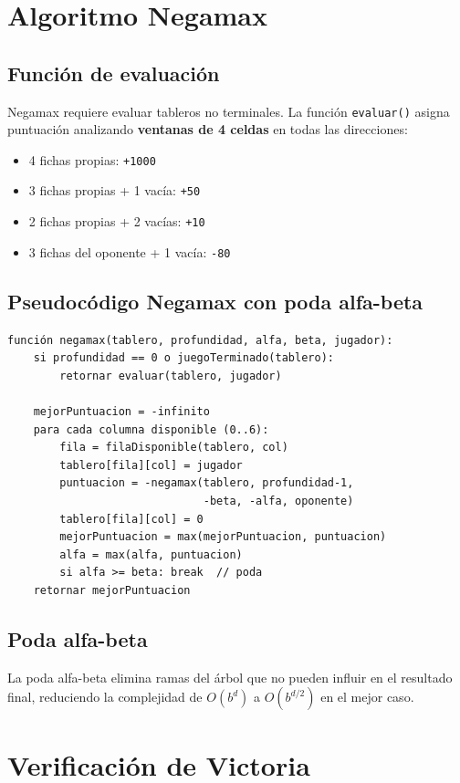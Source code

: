 \documentclass[12pt,a4paper]{article}
\begin{document}
\section{Algoritmo Negamax}

\subsection{Función de evaluación}
Negamax requiere evaluar tableros no terminales. La función \texttt{evaluar()} asigna puntuación analizando \textbf{ventanas de 4 celdas} en todas las direcciones:

\begin{itemize}
  \item 4 fichas propias: \texttt{+1000}
  \item 3 fichas propias + 1 vacía: \texttt{+50}
  \item 2 fichas propias + 2 vacías: \texttt{+10}
  \item 3 fichas del oponente + 1 vacía: \texttt{-80}
\end{itemize}

\subsection{Pseudocódigo Negamax con poda alfa-beta}
\begin{lstlisting}
función negamax(tablero, profundidad, alfa, beta, jugador):
    si profundidad == 0 o juegoTerminado(tablero):
        retornar evaluar(tablero, jugador)

    mejorPuntuacion = -infinito
    para cada columna disponible (0..6):
        fila = filaDisponible(tablero, col)
        tablero[fila][col] = jugador
        puntuacion = -negamax(tablero, profundidad-1,
                              -beta, -alfa, oponente)
        tablero[fila][col] = 0
        mejorPuntuacion = max(mejorPuntuacion, puntuacion)
        alfa = max(alfa, puntuacion)
        si alfa >= beta: break  // poda
    retornar mejorPuntuacion
\end{lstlisting}

\subsection{Poda alfa-beta}
La poda alfa-beta elimina ramas del árbol que no pueden influir en el resultado final, reduciendo la complejidad de $O(b^d)$ a $O(b^{d/2})$ en el mejor caso.

\section{Verificación de Victoria}
\end{document}
